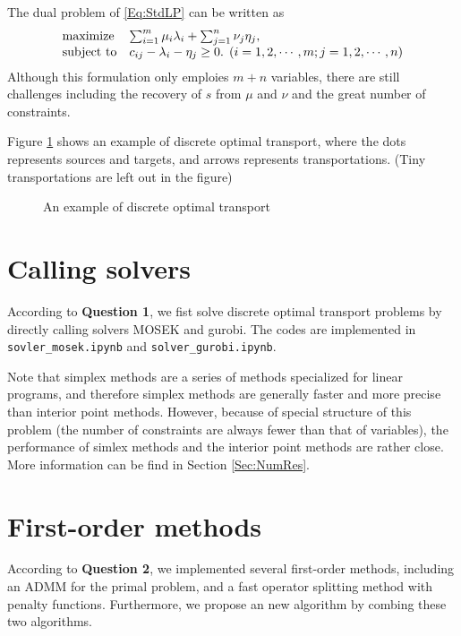 \documentclass[english]{pkupaper}
\begin{document}
The dual problem of \eqref{Eq:StdLP} can be written as 
\begin{equation} \label{Eq:Dual}
\begin{array}{ll}
\mathrel{\text{{maximize}}} & \sum_{ {i} = {1} }^{m}{ \mu_i \lambda_i } + \sum_{ {j} = {1} }^{n}{ \nu_j \eta_j }, \\
\mathrel{\text{{subject to}}} & c_{ i j } - \lambda_i - \eta_j \ge 0. \mathbin{}\left(  i = 1, 2, \cdots, m; j = 1, 2, \cdots, n  \right)
\end{array}
\end{equation}
Although this formulation only emploies $ m + n $ variables, there are still challenges including the recovery of $s$ from $\mu$ and $\nu$ and the great number of constraints.

Figure \ref{Fig:EgDisOT} shows an example of discrete optimal transport, where the dots represents sources and targets, and arrows represents transportations. (Tiny transportations are left out in the figure)

\begin{figure}
\centering \scalebox{0.65}{}
\caption{An example of discrete optimal transport} \label{Fig:EgDisOT}
\end{figure}

\section{Calling solvers} \label{Sec:Sol}

According to \textbf{Question 1}, we fist solve discrete optimal transport problems by directly calling solvers MOSEK and gurobi. The codes are implemented in \verb"sovler_mosek.ipynb" and \verb"solver_gurobi.ipynb".

Note that simplex methods are a series of methods specialized for linear programs, and therefore simplex methods are generally faster and more precise than interior point methods. However, because of special structure of this problem (the number of constraints are always fewer than that of variables), the performance of simlex methods and the interior point methods are rather close. More information can be find in Section \ref{Sec:NumRes}.

\section{First-order methods} \label{Sec:FOM}

According to \textbf{Question 2}, we implemented several first-order methods, including an ADMM for the primal problem, and a fast operator splitting method with penalty functions. Furthermore, we propose an new algorithm by combing these two algorithms.
\end{document}
